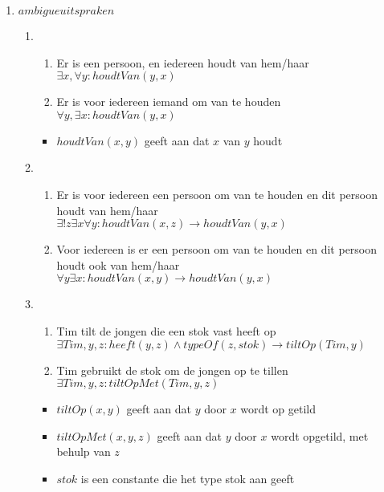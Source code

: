\documentclass[]{article}
\begin{document}
\begin{enumerate}[a]
    \item $ ambigue uitspraken $
    \begin{enumerate}[i]
      \item
      \begin{enumerate}[1]
        \item Er is een persoon, en iedereen houdt van hem/haar \\ $\exists x, \forall y: houdtVan(y,x)$
        \item Er is voor iedereen iemand om van te houden \\  $\forall y, \exists x: houdtVan(y,x)$
      \end{enumerate}
      \begin{itemize}
        \item $houdtVan(x,y)$ geeft aan dat $x$ van $y$ houdt
      \end{itemize}
      \item
      \begin{enumerate}[1]
        \item Er is voor iedereen een persoon om van te houden en dit persoon houdt van hem/haar \\  $\exists! z \exists x \forall y: houdtVan(x,z) \longrightarrow houdtVan(y,x)$
        \item Voor iedereen is er een persoon om van te houden en dit persoon houdt ook van hem/haar \\ $\forall y \exists x: houdtVan(x,y) \longrightarrow houdtVan(y,x)$
      \end{enumerate}
      \item
      \begin{enumerate}[1]
        \item Tim tilt de jongen die een stok vast heeft op  \\ $\exists Tim, y, z: heeft(y,z)\land typeOf(z,stok) \longrightarrow tiltOp(Tim,y) $
        \item Tim gebruikt de stok om de jongen op te tillen \\ $\exists Tim, y, z: tiltOpMet(Tim,y,z) $
      \end{enumerate}
      \begin{itemize}
        \item $tiltOp(x,y)$ geeft aan dat $y$ door $x$ wordt op getild
        \item $tiltOpMet(x,y,z)$ geeft aan dat $y$ door $x$ wordt opgetild, met behulp van $z$
        \item $stok$ is een constante die het type stok aan geeft

\end{itemize}
\end{enumerate}
\end{enumerate}
\end{document}
